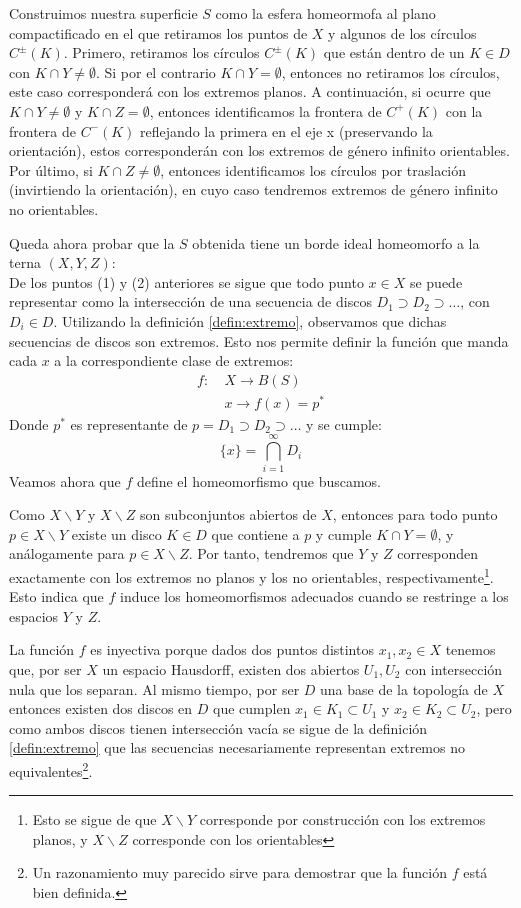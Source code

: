 \documentclass[a4paper,11pt,spanish, twoside, leqno]{tfg-uam}
\theoremstyle{definition}
\begin{document}
Construimos nuestra superficie $S$ como la esfera homeormofa al plano compactificado en el que retiramos los puntos de $X$ y algunos de los círculos $C^\pm(K)$. Primero, retiramos los círculos $C^\pm(K)$ que están dentro de un $K\in D$ con $K \cap Y \neq \emptyset$. Si por el contrario  $K \cap Y = \emptyset$, entonces no retiramos los círculos, este caso corresponderá con los extremos planos. A continuación,  si ocurre que $K \cap Y \neq \emptyset$  y $K \cap Z = \emptyset$, entonces identificamos la frontera de $C^+(K)$ con la frontera de $C^-(K)$ reflejando la primera en el eje x (preservando la orientación), estos corresponderán con los extremos de género infinito orientables.  Por último, si $K \cap Z \neq \emptyset$, entonces identificamos los círculos por traslación (invirtiendo la orientación), en cuyo caso tendremos extremos de género infinito no orientables.

Queda ahora probar que la $S$ obtenida tiene un borde ideal homeomorfo a la terna $(X,Y,Z)$:\\
De los puntos (1) y (2) anteriores se sigue que todo punto $x\in X$ se puede representar como la intersección de una secuencia de discos $D_1 \supset D_2 \supset \ldots$, con $D_i \in D$. Utilizando la definición \ref{defin:extremo}, observamos que dichas secuencias de discos son extremos. Esto nos permite definir la función que manda cada $x$ a la correspondiente clase de extremos:
\begin{align*}
f:& \: X \longrightarrow  B(S)\\
& \: x \longrightarrow f(x) = p^*
\end{align*}
Donde $p^*$ es representante de $p = D_1 \supset D_2 \supset \ldots $ y se cumple:
\[
\{x\} = \bigcap_{i = 1}^{\infty} D_i
\]
Veamos ahora que $f$ define el homeomorfismo que buscamos.

Como $X\backslash Y$ y $X\backslash Z$ son subconjuntos abiertos de $X$, entonces para todo punto $p\in X\backslash Y$ existe un disco $K\in D$ que contiene a $p$ y cumple $K \cap Y = \emptyset$, y análogamente para $p \in X\backslash Z$. Por tanto, tendremos que $Y$ y $Z$ corresponden exactamente con los extremos no planos y los no orientables, respectivamente\footnote{Esto se sigue de que $X\backslash Y$ corresponde por construcción con los extremos planos, y $X\backslash Z$ corresponde con los orientables}. Esto indica que $f$ induce los homeomorfismos adecuados cuando se restringe a los espacios $Y$ y $Z$.

La función $f$ es inyectiva porque dados  dos puntos distintos  $x_1, x_2 \in X$ tenemos que, por ser $X$ un espacio Hausdorff, existen dos abiertos $U_1, U_2$ con intersección nula que los separan. Al mismo tiempo, por ser $D$ una base de la topología de $X$ entonces existen dos discos en $D$ que cumplen $x_1 \in K_1 \subset U_1$ y $x_2 \in K_2 \subset U_2$, pero como ambos discos tienen intersección vacía se sigue de la definición \ref{defin:extremo} que las secuencias necesariamente representan extremos no equivalentes\footnote{Un razonamiento muy parecido sirve para demostrar que la función $f$ está bien definida.}.
\end{document}
